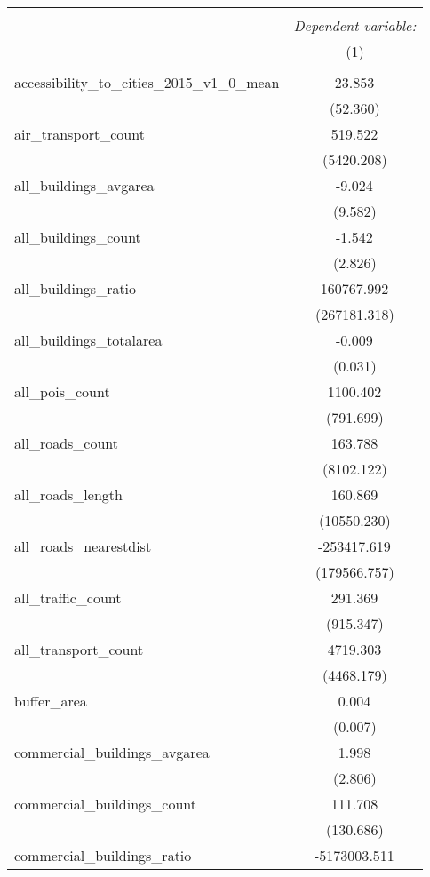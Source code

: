\begin{table}[!htbp] \centering
\begin{tabular}{@{\extracolsep{5pt}}lc}
\\[-1.8ex]\hline
\hline \\[-1.8ex]
& \multicolumn{1}{c}{\textit{Dependent variable:}} \
\cr \cline{1-2}
\\[-1.8ex] & (1) \\
\hline \\[-1.8ex]
 accessibility_to_cities_2015_v1_0_mean & 23.853$^{}$ \\
  & (52.360) \\
 air_transport_count & 519.522$^{}$ \\
  & (5420.208) \\
 all_buildings_avgarea & -9.024$^{}$ \\
  & (9.582) \\
 all_buildings_count & -1.542$^{}$ \\
  & (2.826) \\
 all_buildings_ratio & 160767.992$^{}$ \\
  & (267181.318) \\
 all_buildings_totalarea & -0.009$^{}$ \\
  & (0.031) \\
 all_pois_count & 1100.402$^{}$ \\
  & (791.699) \\
 all_roads_count & 163.788$^{}$ \\
  & (8102.122) \\
 all_roads_length & 160.869$^{}$ \\
  & (10550.230) \\
 all_roads_nearestdist & -253417.619$^{}$ \\
  & (179566.757) \\
 all_traffic_count & 291.369$^{}$ \\
  & (915.347) \\
 all_transport_count & 4719.303$^{}$ \\
  & (4468.179) \\
 buffer_area & 0.004$^{}$ \\
  & (0.007) \\
 commercial_buildings_avgarea & 1.998$^{}$ \\
  & (2.806) \\
 commercial_buildings_count & 111.708$^{}$ \\
  & (130.686) \\
 commercial_buildings_ratio & -5173003.511$^{}$ \\

\end{tabular}
\end{table}
